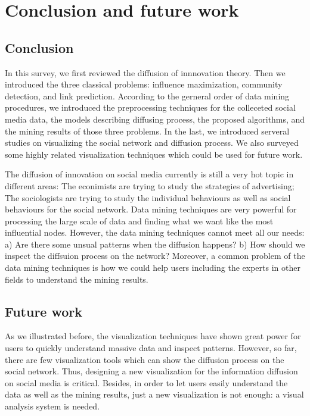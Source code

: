 \chapter{Conclusion and future work}
\label{chap:conclusion}

\section{Conclusion}
In this survey, we first reviewed the diffusion of innnovation theory. Then we introduced the three classical problems: influence maximization, community detection, and link prediction. According to the gerneral order of data mining procedures, we introduced the preprocessing techniques for the colleceted social media data, the models describing diffusing process, the proposed algorithms, and the mining results of those three problems. In the last, we introduced serveral studies on visualizing the social network and diffusion process. We also surveyed some highly related visualization techniques which could be used for future work. 

The diffusion of innovation on social media currently is still a very hot topic in different areas: The econimists are trying to study the strategies of advertising; The sociologists are trying to study the individual behaviours as well as social behaviours for the social network. Data mining techniques are very powerful for processing the large scale of data and finding what we want like the most influential nodes. However, the data mining techniques cannot meet all our needs: a) Are there some unsual patterns when the diffusion happens? b) How should we inspect the diffsuion process on the network? Moreover, a common problem of the data mining techniques is how we could help users including the experts in other fields to understand the mining results. 

\section{Future work}

As we illustrated before, the visualization techniques have shown great power for users to quickly understand massive data and inspect patterns. However, so far, there are few visualization tools which can show the diffusion process on the social network. Thus, designing a new visualization for the information diffusion on social media is critical. Besides, in order to let users easily understand the data as well as  the mining results, just a new visualization is not enough: a visual analysis system is needed.

